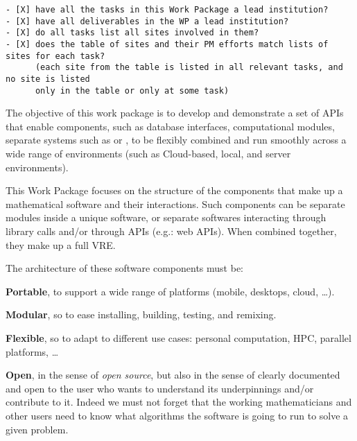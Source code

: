 \begin{draft}
\begin{verbatim}
- [X] have all the tasks in this Work Package a lead institution?
- [X] have all deliverables in the WP a lead institution?
- [X] do all tasks list all sites involved in them?
- [X] does the table of sites and their PM efforts match lists of sites for each task?
      (each site from the table is listed in all relevant tasks, and no site is listed
      only in the table or only at some task)
\end{verbatim}
\end{draft}

\begin{workpackage}[id=component-architecture,wphases=0-48!.5,
  title=Component Architecture,lead=UV,
  PSRM=46,UVRM=8,SARM=16, USORM=6, UORM=19, LLRM=14, UJFRM=6, UGRM=14]

  \begin{wpobjectives}
    The objective of this work package is to develop and demonstrate a
    set of APIs that enable components, such as database interfaces,
    computational modules, separate systems such as \GAP or \Sage, to
    be flexibly combined and run smoothly across a wide range of
    environments (such as Cloud-based, local, and server environments).
  \end{wpobjectives}

  \begin{wpdescription}
    This Work Package focuses on the structure of the components that make
    up a mathematical software and their interactions. Such components
    can be separate modules inside a unique software, or separate
    softwares interacting through library calls and/or through APIs
    (e.g.: web APIs). When combined together, they make up a full VRE.

    The architecture of these software components must be:
    \begin{compactitem}
    \item \textbf{Portable}, to support a wide range of platforms
      (mobile, desktops, cloud, \dots).
    \item \textbf{Modular}, so to ease installing, building, testing,
      and remixing.
    \item \textbf{Flexible}, so to adapt to different use cases:
      personal computation, HPC, parallel platforms, \dots
    \item \textbf{Open}, in the sense of \emph{open source}, but also
      in the sense of clearly documented and open to
      the user who wants to understand its underpinnings and/or
      contribute to it. Indeed we must not forget that the working
      mathematicians and other users need to know what algorithms the software is
      going to run to solve a given problem.
    \end{compactitem}
  \end{wpdescription}


\end{workpackage}
